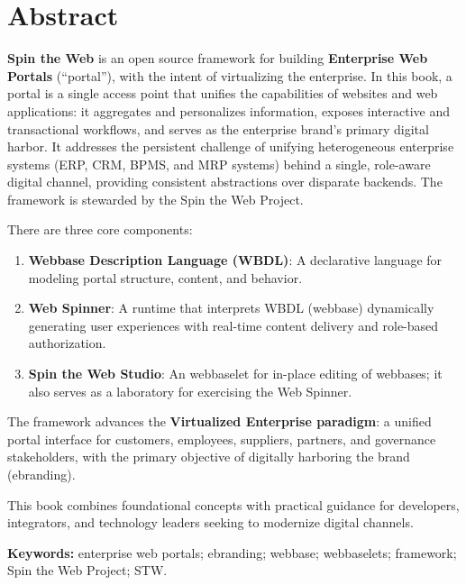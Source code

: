 
\chapter*{Abstract}
\textbf{Spin the Web} is an open source framework for building \textbf{Enterprise Web Portals} (``\gls{portal}''), with the intent of virtualizing the enterprise. In this book, a portal is a single access point that unifies the capabilities of websites and web applications: it aggregates and personalizes information, exposes interactive and transactional workflows, and serves as the enterprise brand's primary digital harbor. It addresses the persistent challenge of unifying heterogeneous enterprise systems (ERP, CRM, BPMS, and MRP systems) behind a single, role-aware digital channel, providing consistent abstractions over disparate backends. The framework is stewarded by the Spin the Web Project.

There are three core components:
\begin{enumerate}
\item \textbf{Webbase Description Language (WBDL)}: A declarative language for modeling portal structure, content, and behavior.
\item \textbf{Web Spinner}: A runtime that interprets WBDL (webbase) dynamically generating user experiences with real-time content delivery and role-based authorization.
\item \textbf{Spin the Web Studio}: An webbaselet for in-place editing of webbases; it also serves as a laboratory for exercising the Web Spinner.
\end{enumerate}

The framework advances the \textbf{Virtualized Enterprise paradigm}: a unified portal interface for customers, employees, suppliers, partners, and governance stakeholders, with the primary objective of digitally harboring the brand (\gls{ebranding}).

This book combines foundational concepts with practical guidance for developers, integrators, and technology leaders seeking to modernize digital channels.

\textbf{Keywords:} enterprise web portals; ebranding; webbase; webbaselets; framework; Spin the Web Project; STW.

\clearpage
